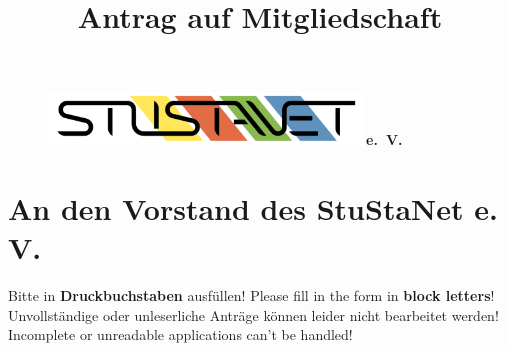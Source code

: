 \documentclass[a4paper,10pt]{scrartcl}
\title{Antrag auf Mitgliedschaft}
\date{}
\begin{document}

\maketitle
\vspace{-60pt}

\begin{figure}[t!]
   \centering
   \vspace{-40pt}
   \mbox{\includegraphics[width=0.75\textwidth,keepaspectratio]{StuStaNet_Logo}\Huge \sffamily \textbf{e. V.}}
   \vspace{-40pt}
\end{figure}


\section*{An den Vorstand des StuStaNet e. V.}






	\Large Bitte in \textbf{Druckbuchstaben} ausfüllen! Please fill in the form in \textbf{block letters}!\\
\large Unvollständige oder unleserliche Anträge können leider nicht bearbeitet werden!\\
Incomplete or unreadable applications can't be handled!


\vfill
\end{document}
